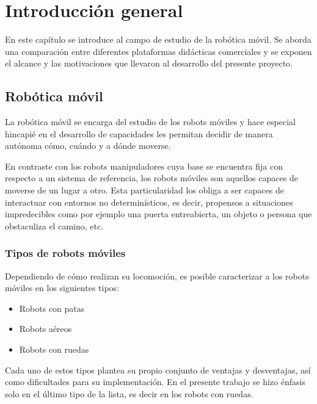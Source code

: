 \chapter{Introducción general}

\label{Capitulo1}

\newcommand{\keyword}[1]{\textbf{#1}}
\newcommand{\tabhead}[1]{\textbf{#1}}
\newcommand{\code}[1]{\texttt{#1}}
\newcommand{\file}[1]{\texttt{\bfseries#1}}
\newcommand{\option}[1]{\texttt{\itshape#1}}
\newcommand{\grados}{$^{\circ}$}

En este capítulo se introduce al campo de estudio de la robótica móvil. Se aborda una comparación entre diferentes plataformas didácticas comerciales y se exponen el alcance y las motivaciones que llevaron al desarrollo del presente proyecto.

\section{Robótica móvil}

La robótica móvil se encarga del estudio de los robots móviles y hace especial hincapié en el desarrollo de capacidades les permitan decidir de manera autónoma cómo, cuándo y a dónde moverse.

En contraste con los robots manipuladores cuya base se encuentra fija con respecto a un sistema de referencia, los robots móviles son aquellos capaces de moverse de un lugar a otro. Esta particularidad los obliga a ser capaces de interactuar con entornos no determinísticos, es decir, propensos a situaciones impredecibles como por ejemplo una puerta entreabierta, un objeto o persona que obstaculiza el camino, etc.

\subsection{Tipos de robots móviles}

Dependiendo de cómo realizan su locomoción, es posible caracterizar a los robots móviles en los siguientes tipos:
\begin{itemize}
	\item{Robots con patas}
	\item{Robots aéreos}
	\item{Robots con ruedas}
\end{itemize}

Cada uno de estos tipos plantea su propio conjunto de ventajas y desventajas, así como dificultades para su implementación. En el presente trabajo se hizo énfasis solo en el último tipo de la lista, es decir en los robots con ruedas.

